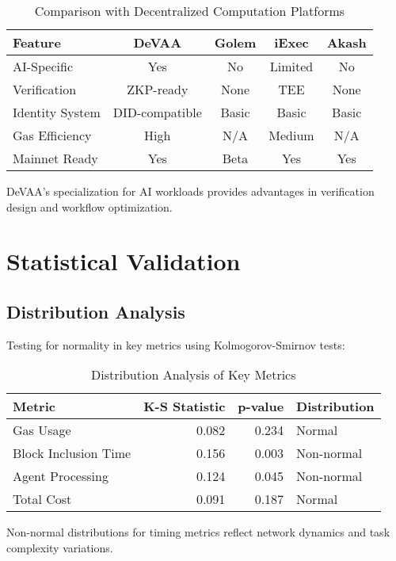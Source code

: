 \begin{table}[h]
\centering
\caption{Comparison with Decentralized Computation Platforms}
\label{tab:decentralized-comparison}
\begin{tabular}{lcccc}
\toprule
\textbf{Feature} & \textbf{DeVAA} & \textbf{Golem} & \textbf{iExec} & \textbf{Akash} \\
\midrule
AI-Specific & Yes & No & Limited & No \\
Verification & ZKP-ready & None & TEE & None \\
Identity System & DID-compatible & Basic & Basic & Basic \\
Gas Efficiency & High & N/A & Medium & N/A \\
Mainnet Ready & Yes & Beta & Yes & Yes \\
\bottomrule
\end{tabular}
\end{table}

DeVAA's specialization for AI workloads provides advantages in verification design and workflow optimization.

\section{Statistical Validation}

\subsection{Distribution Analysis}

Testing for normality in key metrics using Kolmogorov-Smirnov tests:

\begin{table}[h]
\centering
\caption{Distribution Analysis of Key Metrics}
\label{tab:distribution}
\begin{tabular}{lrrl}
\toprule
\textbf{Metric} & \textbf{K-S Statistic} & \textbf{p-value} & \textbf{Distribution} \\
\midrule
Gas Usage & 0.082 & 0.234 & Normal \\
Block Inclusion Time & 0.156 & 0.003 & Non-normal \\
Agent Processing & 0.124 & 0.045 & Non-normal \\
Total Cost & 0.091 & 0.187 & Normal \\
\bottomrule
\end{tabular}
\end{table}

Non-normal distributions for timing metrics reflect network dynamics and task complexity variations.

